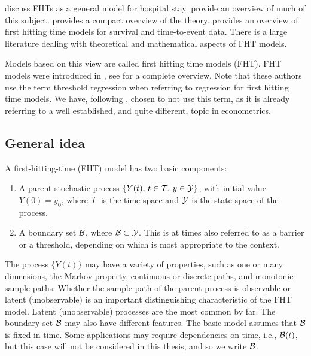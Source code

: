 \citet{eaton-whitmore} discuss FHTs as a general model for hospital stay. \citet{aalengjessing2001} provide an overview of much of this subject. \citet{lawless2011} provides a compact overview of the theory. \citet{leewhitmore2004a} provides an overview of first hitting time models for survival and time-to-event data. There is a large literature dealing with theoretical and mathematical aspects of FHT models.

Models based on this view are called first hitting time models (FHT). FHT models were introduced in \citet{whitmore1986}, see \citet{leewhitmore2006} for a complete overview. Note that these authors use the term threshold regression when referring to regression for first hitting time models. We have, following \citet{caroni2017}, chosen to not use this term, as it is already referring to a well established, and quite different, topic in econometrics.

\subsection{General idea}\label{fht-idea}
A first-hitting-time (FHT) model has two basic components:
\begin{enumerate}
\item A parent stochastic process $\{Y(t),\,t\in\mathcal{T},\,y\in\mathcal{Y}\}$, with initial value $Y(0)=y_0$, where $\mathcal{T}$ is the time space and $\mathcal{Y}$ is the state space of the process.
\item A boundary set $\mathcal{B}$, where $\mathcal{B}\subset\mathcal{Y}$. This is at times also referred to as a barrier or a threshold, depending on which is most appropriate to the context.
\end{enumerate}
The process $\{Y(t)\}$ may have a variety of properties, such as one or many dimensions, the Markov property, continuous or discrete paths, and monotonic sample paths. Whether the sample path of the parent process is observable or latent (unobservable) is an important distinguishing characteristic of the FHT model. Latent (unobservable) processes are the most common by far. The boundary set $\mathcal{B}$ may also have different features. The basic model assumes that $\mathcal{B}$ is fixed in time.
Some applications may require dependencies on time, i.e., $\mathcal{B}(t)$, but this case will not be considered in this thesis, and so we write $\mathcal{B}$.

